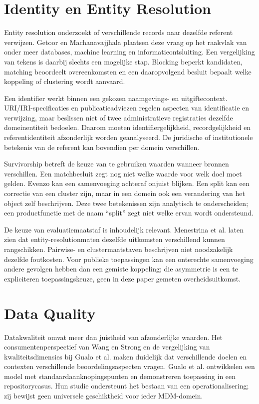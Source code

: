 \section{Identity en Entity Resolution}
Entity resolution onderzoekt of verschillende records naar dezelfde referent verwijzen. Getoor en Machanavajjhala plaatsen deze vraag op het raakvlak van onder meer databases, machine learning en informatieontsluiting. Een vergelijking van tekens is daarbij slechts een mogelijke stap. Blocking beperkt kandidaten, matching beoordeelt overeenkomsten en een daaropvolgend besluit bepaalt welke koppeling of clustering wordt aanvaard. \parencite{L21,L29,L30}

Een identifier werkt binnen een gekozen naamgevings- en uitgiftecontext. URI/IRI-specificaties en publicatieadviezen regelen aspecten van identificatie en verwijzing, maar beslissen niet of twee administratieve registraties dezelfde domeinentiteit bedoelen. Daarom moeten identifiergelijkheid, recordgelijkheid en referentidentiteit afzonderlijk worden geanalyseerd. De juridische of institutionele betekenis van de referent kan bovendien per domein verschillen. \parencite{S38,S39,L08}

Survivorship betreft de keuze van te gebruiken waarden wanneer bronnen verschillen. Een matchbesluit zegt nog niet welke waarde voor welk doel moet gelden. Evenzo kan een samenvoeging achteraf onjuist blijken. Een split kan een correctie van een cluster zijn, maar in een domein ook een verandering van het object zelf beschrijven. Deze twee betekenissen zijn analytisch te onderscheiden; een productfunctie met de naam ``split'' zegt niet welke ervan wordt ondersteund. \parencite{P01,L22,L08}

De keuze van evaluatiemaatstaf is inhoudelijk relevant. Menestrina et al. laten zien dat entity-resolutionmaten dezelfde uitkomsten verschillend kunnen rangschikken. Pairwise- en clustermaatstaven beschrijven niet noodzakelijk dezelfde foutkosten. Voor publieke toepassingen kan een onterechte samenvoeging andere gevolgen hebben dan een gemiste koppeling; die asymmetrie is een te expliciteren toepassingskeuze, geen in deze paper gemeten overheidsuitkomst. \parencite{L22}

\section{Data Quality}
Datakwaliteit omvat meer dan juistheid van afzonderlijke waarden. Het consumentenperspectief van Wang en Strong en de vergelijking van kwaliteitsdimensies bij Gualo et al. maken duidelijk dat verschillende doelen en contexten verschillende beoordelingsaspecten vragen. Gualo et al. ontwikkelen een model met standaardaanknopingspunten en demonstreren toepassing in een repositorycasus. Hun studie ondersteunt het bestaan van een operationalisering; zij bewijst geen universele geschiktheid voor ieder MDM-domein. \parencite{L15,L19}

